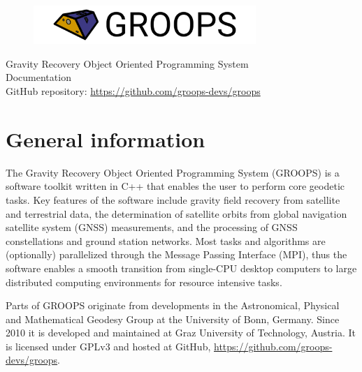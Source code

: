 \documentclass[10pt,twoside,titlepage]{report}
\begin{document}
\hfuzz=5000pt
\vfuzz=5000pt

\graphicspath{{../figures/}}

\thispagestyle{empty}
\begin{center}
\vspace*{6cm}
\begin{figure}[!h]
\centering
\includegraphics*[width=0.75\textwidth]{groops_banner}
\end{figure}
\vspace*{0.2cm}
{\huge\sf Gravity Recovery Object Oriented Programming System} \\
\vspace*{2cm}
{\huge\sf Documentation} \\
\vspace*{2cm}
{\Large\sf GitHub repository: \url{https://github.com/groops-devs/groops}}
\end{center}

\newpage
\clearpage{\pagestyle{empty}} %
\tableofcontents%
\clearpage{\pagestyle{empty}\cleardoublepage\clearpage}

\chapter{General information}
The Gravity Recovery Object Oriented Programming System (GROOPS) is a software toolkit written in C++
that enables the user to perform core geodetic tasks.
Key features of the software include gravity field recovery from satellite and terrestrial data,
the determination of satellite orbits from global navigation satellite system (GNSS) measurements,
and the processing of GNSS constellations and ground station networks. Most tasks and algorithms are
(optionally) parallelized through the Message Passing Interface (MPI), thus the software enables
a smooth transition from single-CPU desktop computers to large distributed
computing environments for resource intensive tasks.

Parts of GROOPS originate from developments in the Astronomical, Physical and Mathematical Geodesy Group
at the University of Bonn, Germany. Since 2010 it is developed and maintained at Graz University of Technology, Austria.
It is licensed under GPLv3 and hosted at GitHub, \url{https://github.com/groops-devs/groops}.
\end{document}

